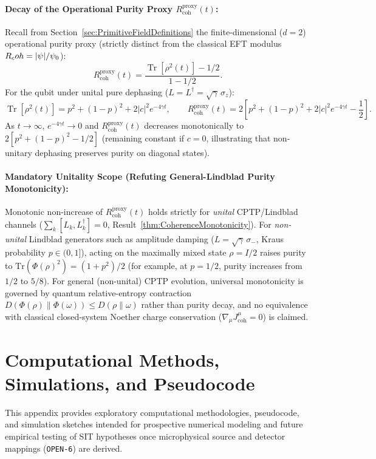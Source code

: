 \paragraph{Decay of the Operational Purity Proxy $R_{\mathrm{coh}}^{\mathrm{proxy}}(t)$:}
Recall from Section~\ref{sec:PrimitiveFieldDefinitions} the finite-dimensional ($d=2$) operational purity proxy (strictly distinct from the classical EFT modulus $R_coh = |\psi|/\psi_0$):
\[
R_{\mathrm{coh}}^{\mathrm{proxy}}(t) = \frac{\operatorname{Tr}[\rho^2(t)] - 1/2}{1 - 1/2}.
\]
For the qubit under unital pure dephasing ($L = L^\dagger = \sqrt{\gamma}\,\sigma_z$):
\[
\operatorname{Tr}[\rho^2(t)] = p^2 + (1-p)^2 + 2|c|^2 e^{-4\gamma t},
\qquad
R_{\mathrm{coh}}^{\mathrm{proxy}}(t) = 2\left[ p^2 + (1-p)^2 + 2|c|^2 e^{-4\gamma t} - \frac{1}{2} \right].
\]
As $t\to\infty$, $e^{-4\gamma t}\to 0$ and $R_{\mathrm{coh}}^{\mathrm{proxy}}(t)$ decreases monotonically to $2[p^2 + (1-p)^2 - 1/2]$ (remaining constant if $c = 0$, illustrating that non-unitary dephasing preserves purity on diagonal states).

\paragraph{Mandatory Unitality Scope (Refuting General-Lindblad Purity Monotonicity):}
Monotonic non-increase of $R_{\mathrm{coh}}^{\mathrm{proxy}}(t)$ holds strictly for \emph{unital} CPTP/Lindblad channels ($\sum_k [L_k, L_k^\dagger] = 0$, Result~\ref{thm:CoherenceMonotonicity}). For \emph{non-unital} Lindblad generators such as amplitude damping ($L = \sqrt{\gamma}\,\sigma_-$, Kraus probability $p \in (0,1]$), acting on the maximally mixed state $\rho = I/2$ raises purity to $\mathrm{Tr}(\Phi(\rho)^2) = (1 + p^2)/2$ (for example, at $p = 1/2$, purity increases from $1/2$ to $5/8$). For general (non-unital) CPTP evolution, universal monotonicity is governed by quantum relative-entropy contraction $D(\Phi(\rho)\|\Phi(\omega)) \le D(\rho\|\omega)$ rather than purity decay, and no equivalence with classical closed-system Noether charge conservation ($\nabla_\mu J^\mu_{\mathrm{coh}} = 0$) is claimed.

\section{Computational Methods, Simulations, and Pseudocode}
\label{appendix:tools}

This appendix provides exploratory computational methodologies, pseudocode, and simulation sketches intended for prospective numerical modeling and future empirical testing of SIT hypotheses once microphysical source and detector mappings (\texttt{OPEN-6}) are derived.

